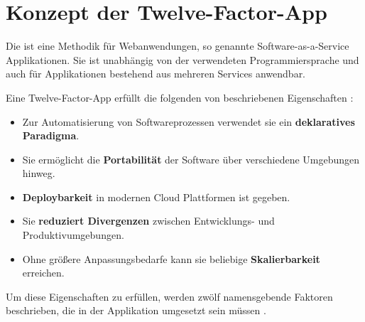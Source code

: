 \section{Konzept der Twelve-Factor-App}
\label{sec:03-05_concept-of-twelve-factor-app}

Die  ist eine Methodik für Webanwendungen, so genannte Software-as-a-Service Applikationen. Sie ist unabhängig von der verwendeten Programmiersprache und auch für Applikationen bestehend aus mehreren Services anwendbar. \cite{101:The-Twelve-Factor-App}

Eine Twelve-Factor-App erfüllt die folgenden von \citeauthor{103:Creating-Cloud-native-applications-12-Factor-Applications} beschriebenen Eigenschaften \cite{103:Creating-Cloud-native-applications-12-Factor-Applications}:

\begin{itemize}
    \item Zur Automatisierung von Softwareprozessen verwendet sie ein \textbf{deklaratives Paradigma}.
    \item Sie ermöglicht die \textbf{Portabilität} der Software über verschiedene Umgebungen hinweg.
    \item \textbf{Deploybarkeit} in modernen Cloud Plattformen ist gegeben.
    \item Sie \textbf{reduziert Divergenzen} zwischen Entwicklungs- und Produktivumgebungen.
    \item Ohne größere Anpassungsbedarfe kann sie beliebige \textbf{Skalierbarkeit} erreichen.
\end{itemize}

Um diese Eigenschaften zu erfüllen, werden zwölf namensgebende Faktoren beschrieben, die in der Applikation umgesetzt sein müssen \cite{101:The-Twelve-Factor-App,102:Twelve-Factor-App-Revisited}.


